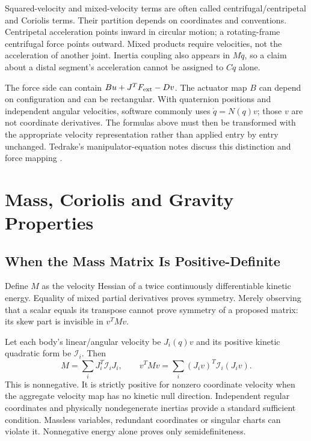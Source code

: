 Squared-velocity and mixed-velocity terms are often called centrifugal/centripetal and Coriolis terms. Their partition depends on coordinates and conventions. Centripetal acceleration points inward in circular motion; a rotating-frame centrifugal force points outward. Mixed products require velocities, not the acceleration of another joint. Inertia coupling also appears in $M\ddot q$, so a claim about a distal segment's acceleration cannot be assigned to $C\dot q$ alone.

The force side can contain $Bu+J^TF_{\rm ext}-Dv$. The actuator map $B$ can depend on configuration and can be rectangular. With quaternion positions and independent angular velocities, software commonly uses $\dot q=N(q)v$; those $v$ are not coordinate derivatives. The formulas above must then be transformed with the appropriate velocity representation rather than applied entry by entry unchanged. Tedrake's manipulator-equation notes discuss this distinction and force mapping \cite{TedrakeMultibodySupplement}.

\section{Mass, Coriolis and Gravity Properties}
\label{sec:lagrangian_matrix_properties}

\subsection{When the Mass Matrix Is Positive-Definite}
\label{subsec:lagrangian_mass}

Define $M$ as the velocity Hessian of a twice continuously differentiable kinetic energy. Equality of mixed partial derivatives proves symmetry. Merely observing that a scalar equals its transpose cannot prove symmetry of a proposed matrix: its skew part is invisible in $v^TMv$.

Let each body's linear/angular velocity be $J_i(q)v$ and its positive kinetic quadratic form be $\mathcal I_i$. Then
\begin{equation}
M=\sum_iJ_i^T\mathcal I_iJ_i,\qquad
v^TMv=\sum_i(J_iv)^T\mathcal I_i(J_iv).
\label{eq:lagrangian_mass_pullback}
\end{equation}
This is nonnegative. It is strictly positive for nonzero coordinate velocity when the aggregate velocity map has no kinetic null direction. Independent regular coordinates and physically nondegenerate inertias provide a standard sufficient condition. Massless variables, redundant coordinates or singular charts can violate it. Nonnegative energy alone proves only semidefiniteness.

